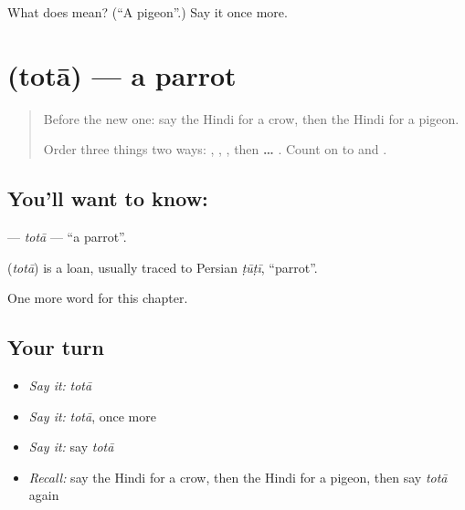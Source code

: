 \begin{tcolorbox}[breakable,colback=teal!4,colframe=teal!35!black,title={Before you move on}]
What does  mean? (\textquotedblleft{}A pigeon\textquotedblright{}.) Say it once more.
\end{tcolorbox}
\section[\texorpdfstring{\hi{तोता} (totā)}{तोता (totā)}]{ (totā) — a parrot}

\label{lesson:HI-C148-tota}



\begin{quote}
Before the new one: say the Hindi for a crow, then the Hindi for a pigeon.

Order three things two ways: \textbf{}, \textbf{}, \textbf{}, then \textbf{ … }. Count on to \textbf{} and \textbf{}.
\end{quote}

\subsection*{You'll want to know: }
\textbf{} — \emph{totā} — \textquotedblleft{}a parrot\textquotedblright{}.

\begin{cousinweb}
\textbf{} (\emph{totā}) is a loan, usually traced to Persian \emph{ṭūṭī}, \textquotedblleft{}parrot\textquotedblright{}.
\end{cousinweb}

\begin{grammarlens}[title={What you've built}]
One more word for this chapter.
\end{grammarlens}

\subsection*{Your turn}
\begin{itemize}
\raggedright
  \item \emph{Say it:} \emph{totā}
  \item \emph{Say it:} \emph{totā}, once more
  \item \emph{Say it:} say \emph{totā}
  \item \emph{Recall:} say the Hindi for a crow, then the Hindi for a pigeon, then say \emph{totā} again
\end{itemize}

